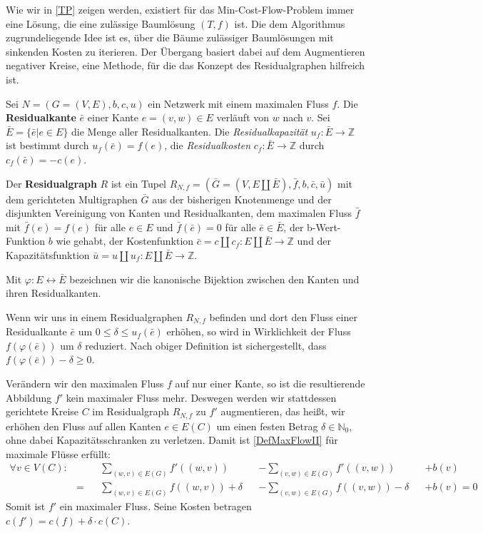 Wie wir in \cref{TP} zeigen werden, existiert für das Min-Cost-Flow-Problem immer eine Lösung, die eine zulässige Baumlösung $(T,f)$ ist. Die dem Algorithmus zugrundeliegende Idee ist es, über die Bäume zulässiger Baumlösungen mit sinkenden Kosten zu iterieren. Der Übergang basiert dabei auf dem Augmentieren negativer Kreise, eine Methode, für die das Konzept des Residualgraphen hilfreich ist.

\begin{defn}\label{defRes}Sei $N=(G=(V,E),b,c,u)$ ein Netzwerk mit einem maximalen Fluss $f$. Die \textbf{Residualkante} $\bar{e}$ einer Kante $e=(v,w)\in E$ verläuft von $w$ nach $v$. Sei $\bar{E}=\{\bar{e}|e\in E\}$ die Menge aller Residualkanten. Die \textit{Residualkapazität} $u_f:\bar{E}\rightarrow\mathbb{Z}$ ist bestimmt durch $u_f(\bar{e})=f(e)$, die \textit{Residualkosten} $c_f:\bar{E}\rightarrow\mathbb{Z}$ durch $c_f(\bar{e})=-c(e)$.

Der \textbf{Residualgraph} $R$ ist ein Tupel $R_{N,f}=(\bar{G}=(V,E\amalg\bar{E}),\bar{f},b,\bar{c},\bar{u})$ mit dem gerichteten Multigraphen $\bar{G}$ aus der bisherigen Knotenmenge und der disjunkten Vereinigung von Kanten und Residualkanten, dem maximalen Fluss $\bar{f}$ mit $\bar{f}(e)=f(e)$ für alle $e\in E$ und $\bar{f}(\bar{e})=0$ für alle $\bar{e}\in\bar{E}$, der b-Wert-Funktion $b$ wie gehabt, der Kostenfunktion $\bar{c}=c\amalg c_f:E\amalg\bar{E}\rightarrow\mathbb{Z}$ und der Kapazitätsfunktion $\bar{u}=u\amalg u_f:E\amalg\bar{E}\rightarrow\mathbb{Z}$.\end{defn}

\begin{nota}Mit $\varphi:E\leftrightarrow\bar{E}$ bezeichnen wir die kanonische Bijektion zwischen den Kanten und ihren Residualkanten.\end{nota}

Wenn wir uns in einem Residualgraphen $R_{N,f}$ befinden und dort den Fluss einer Residualkante $\bar{e}$ um $0\leq\delta\leq u_f(\bar{e})$ erhöhen, so wird in Wirklichkeit der Fluss $f(\varphi(\bar{e}))$ um $\delta$ reduziert. Nach obiger Definition ist sichergestellt, dass $f(\varphi(\bar{e}))-\delta\geq0$.

Verändern wir den maximalen Fluss $f$ auf nur einer Kante, so ist die resultierende Abbildung $f'$ kein maximaler Fluss mehr. Deswegen werden wir stattdessen gerichtete Kreise $C$ im Residualgraph $R_{N,f}$ zu $f'$ augmentieren, das heißt, wir erhöhen den Fluss auf allen Kanten $e\in E(C)$ um einen festen Betrag $\delta\in\mathbb{N}_0$, ohne dabei Kapazitätsschranken zu verletzen. Damit ist \cref{DefMaxFlowII} für maximale Flüsse erfüllt:
\begin{align*}
\forall v\in V(C) :&&&\sum_{(w,v)\in E(G)} f'((w,v)) &&-\sum_{(v,w)\in E(G)} f'((v,w)) &&+ b(v) \\
&=&&\sum_{(w,v)\in E(G)} f((w,v)) + \delta &&-\sum_{(v,w)\in E(G)} f((v,w)) - \delta &&+ b(v) = 0\end{align*}
Somit ist $f'$ ein maximaler Fluss. Seine Kosten betragen $c(f')=c(f) + \delta\cdot c(C)$.

